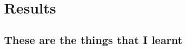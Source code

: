\section{Results}
 
\lipsum[43] %

\subsection{These are the things that I learnt} 
 
\lipsum[44] %
